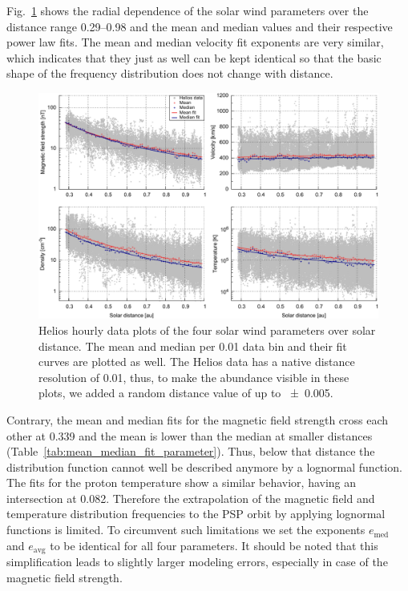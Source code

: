 Fig.~\ref{fig:radial_fit_4_thesis_light_skip_pdfcairo_plot} shows the radial dependence of the solar wind parameters over the distance range \SIrange{0.29}{0.98}{\au} and the mean and median values and their respective power law fits. The mean and median velocity fit exponents are very similar, which indicates that they just as well can be kept identical so that the basic shape of the frequency distribution does not change with distance.
\begin{figure}
	\includegraphics[width=18cm]{figures/radial_fit_4_thesis_light_skip_pdfcairo_plot.pdf}
	\caption{Helios hourly data plots of the four solar wind parameters over solar distance. The mean and median per \SI{0.01}{\au} data bin and their fit curves are plotted as well. The Helios data has a native distance resolution of \SI{0.01}{\au}, thus, to make the abundance visible in these plots, we added a random distance value of up to \SI{+-0.005}{\au}.}
	\label{fig:radial_fit_4_thesis_light_skip_pdfcairo_plot}
\end{figure}
Contrary, the mean and median fits for the magnetic field strength cross each other at \SI{0.339}{\au} and the mean is lower than the median at smaller distances (Table~\ref{tab:mean_median_fit_parameter}). Thus, below that distance the distribution function cannot well be described anymore by a lognormal function. The fits for the proton temperature show a similar behavior,
having an intersection at \SI{0.082}{\au}. Therefore the extrapolation of the magnetic field and temperature distribution frequencies to the PSP orbit by applying lognormal functions is limited. To circumvent such limitations we set the exponents $e_\text{med}$ and $e_\text{avg}$ to be identical for all four parameters. It should be noted that this simplification leads to slightly larger modeling errors, especially in case of the magnetic field strength.


